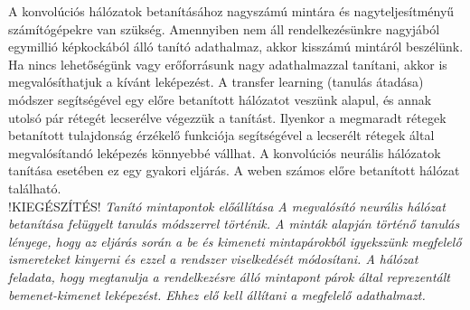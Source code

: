 A konvolúciós hálózatok betanításához nagyszámú mintára és nagyteljesítményű számítógépekre van szükség. Amennyiben nem áll rendelkezésünkre nagyjából egymillió képkockából álló tanító adathalmaz, akkor kisszámú mintáról beszélünk. Ha nincs lehetőségünk vagy erőforrásunk nagy adathalmazzal tanítani, akkor is megvalósíthatjuk a kívánt leképezést. A transfer learning (tanulás átadása) módszer segítségével egy előre betanított hálózatot veszünk alapul, és annak utolsó pár rétegét lecserélve végezzük a tanítást. Ilyenkor a megmaradt rétegek betanított tulajdonság érzékelő funkciója segítségével a lecserélt rétegek által megvalósítandó leképezés könnyebbé vállhat. A konvolúciós neurális hálózatok tanítása esetében ez egy gyakori eljárás. A weben számos előre betanított hálózat található.\\

!KIEGÉSZÍTÉS!
\textit{Tanító mintapontok előállítása
A megvalósító neurális hálózat betanítása felügyelt tanulás módszerrel történik. A minták alapján történő tanulás lényege, hogy az eljárás során a be és kimeneti mintapárokból igyekszünk megfelelő ismereteket kinyerni és ezzel a rendszer viselkedését módosítani. A hálózat feladata, hogy megtanulja a rendelkezésre álló mintapont párok által reprezentált bemenet-kimenet leképezést. Ehhez elő kell állítani a megfelelő adathalmazt.}